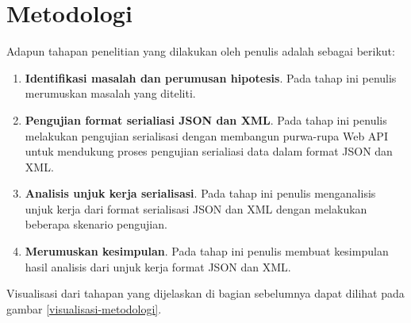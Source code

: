 \documentclass{llncs}
\begin{document}
\section{Metodologi}
\onehalfspacing Adapun tahapan penelitian yang dilakukan oleh penulis adalah sebagai berikut:
\begin{enumerate}
  \item \textbf{Identifikasi masalah dan perumusan hipotesis}. Pada tahap ini penulis merumuskan masalah yang diteliti.
  \item \textbf{Pengujian format serialiasi JSON dan XML}. Pada tahap ini penulis melakukan pengujian serialisasi dengan membangun purwa-rupa Web API untuk mendukung proses pengujian serialiasi data dalam format JSON dan XML.
  \item \textbf{Analisis unjuk kerja serialisasi}. Pada tahap ini penulis menganalisis unjuk kerja dari format serialisasi JSON dan XML dengan melakukan beberapa skenario pengujian.
  \item \textbf{Merumuskan kesimpulan}. Pada tahap ini penulis membuat kesimpulan hasil analisis dari unjuk kerja format JSON dan XML.
\end{enumerate}

Visualisasi dari tahapan yang dijelaskan di bagian sebelumnya dapat dilihat pada gambar \ref{visualisasi-metodologi}.
\end{document}
